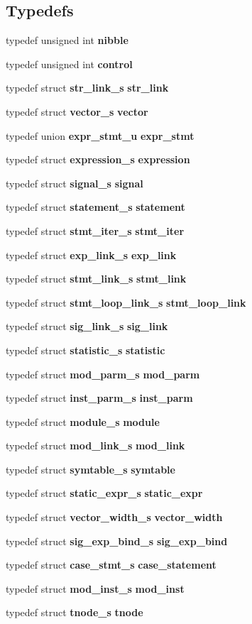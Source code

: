 \subsection*{Typedefs}
\begin{CompactItemize}
\item 
typedef unsigned int {\bf nibble}
\item 
typedef unsigned int {\bf control}
\item 
typedef struct {\bf str\_\-link\_\-s} {\bf str\_\-link}
\item 
typedef struct {\bf vector\_\-s} {\bf vector}
\item 
typedef union {\bf expr\_\-stmt\_\-u} {\bf expr\_\-stmt}
\item 
typedef struct {\bf expression\_\-s} {\bf expression}
\item 
typedef struct {\bf signal\_\-s} {\bf signal}
\item 
typedef struct {\bf statement\_\-s} {\bf statement}
\item 
typedef struct {\bf stmt\_\-iter\_\-s} {\bf stmt\_\-iter}
\item 
typedef struct {\bf exp\_\-link\_\-s} {\bf exp\_\-link}
\item 
typedef struct {\bf stmt\_\-link\_\-s} {\bf stmt\_\-link}
\item 
typedef struct {\bf stmt\_\-loop\_\-link\_\-s} {\bf stmt\_\-loop\_\-link}
\item 
typedef struct {\bf sig\_\-link\_\-s} {\bf sig\_\-link}
\item 
typedef struct {\bf statistic\_\-s} {\bf statistic}
\item 
typedef struct {\bf mod\_\-parm\_\-s} {\bf mod\_\-parm}
\item 
typedef struct {\bf inst\_\-parm\_\-s} {\bf inst\_\-parm}
\item 
typedef struct {\bf module\_\-s} {\bf module}
\item 
typedef struct {\bf mod\_\-link\_\-s} {\bf mod\_\-link}
\item 
typedef struct {\bf symtable\_\-s} {\bf symtable}
\item 
typedef struct {\bf static\_\-expr\_\-s} {\bf static\_\-expr}
\item 
typedef struct {\bf vector\_\-width\_\-s} {\bf vector\_\-width}
\item 
typedef struct {\bf sig\_\-exp\_\-bind\_\-s} {\bf sig\_\-exp\_\-bind}
\item 
typedef struct {\bf case\_\-stmt\_\-s} {\bf case\_\-statement}
\item 
typedef struct {\bf mod\_\-inst\_\-s} {\bf mod\_\-inst}
\item 
typedef struct {\bf tnode\_\-s} {\bf tnode}
\end{CompactItemize}
